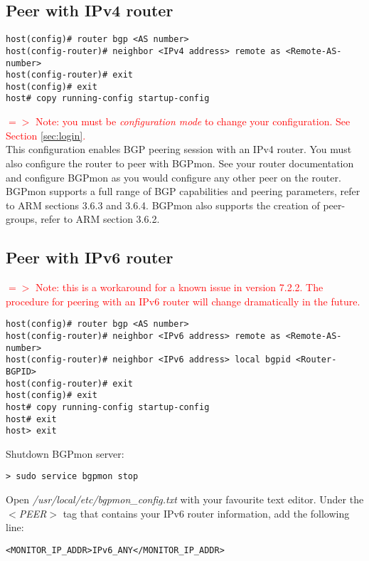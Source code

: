 \documentclass{article}
\newcommand\note[1]{\textcolor{red}{$=>$ #1}}
\begin{document}
\subsection{Peer with IPv4 router}
\label{sec:peer4}

\begin{Verbatim}[frame=single]
host(config)# router bgp <AS number>
host(config-router)# neighbor <IPv4 address> remote as <Remote-AS-number>
host(config-router)# exit
host(config)# exit
host# copy running-config startup-config
\end{Verbatim}
\note{Note: you must be \emph{configuration mode} to change your configuration.   See Section \ref{sec:login}.}
\\
This configuration enables BGP peering session with an IPv4 router.   You must also configure the router to peer with BGPmon.   See your router documentation and configure BGPmon as you would configure any other peer on the router. 
\\
BGPmon supports a full range of BGP capabilities and peering parameters, refer to ARM sections 3.6.3 and 3.6.4.
BGPmon also supports the creation of peer-groups, refer to ARM section 3.6.2.

\subsection{Peer with IPv6 router}
\label{sec:peer6}

\note{Note: this is a workaround for a known issue in version 7.2.2. The procedure for peering with an IPv6 router will change dramatically in the future.}

\begin{Verbatim}[frame=single]
host(config)# router bgp <AS number>
host(config-router)# neighbor <IPv6 address> remote as <Remote-AS-number>
host(config-router)# neighbor <IPv6 address> local bgpid <Router-BGPID>
host(config-router)# exit
host(config)# exit
host# copy running-config startup-config
host# exit
host> exit
\end{Verbatim}

Shutdown BGPmon server:

\begin{Verbatim}[frame=single]
> sudo service bgpmon stop 
\end{Verbatim}

Open \emph{/usr/local/etc/bgpmon\_config.txt} with your favourite text editor. Under the \emph{$<$PEER$>$} tag that contains your IPv6 router information, add the following line:
\begin{Verbatim}[frame=single]
<MONITOR_IP_ADDR>IPv6_ANY</MONITOR_IP_ADDR> 
\end{Verbatim}
\end{document}
